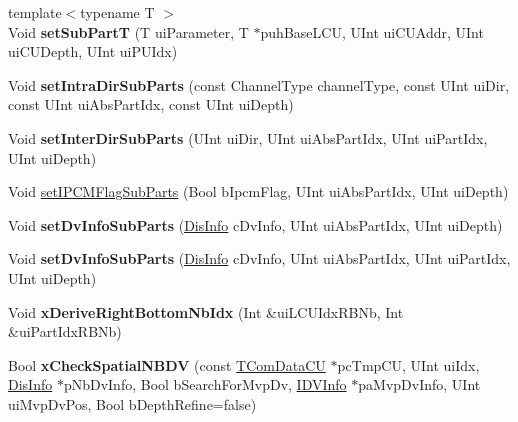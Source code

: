 \begin{DoxyCompactItemize}
\mbox{\label{class_t_com_data_c_u_a2d14701fc84c538dd53acc2389c1ea54}} 
{\footnotesize template$<$typename T $>$ }\\Void {\bfseries set\+Sub\+PartT} (T ui\+Parameter, T $\ast$puh\+Base\+L\+CU, U\+Int ui\+C\+U\+Addr, U\+Int ui\+C\+U\+Depth, U\+Int ui\+P\+U\+Idx)
\item 
\mbox{\label{class_t_com_data_c_u_a11c0dc78fd8f9ff8ff356a08fdd11f7f}} 
Void {\bfseries set\+Intra\+Dir\+Sub\+Parts} (const Channel\+Type channel\+Type, const U\+Int ui\+Dir, const U\+Int ui\+Abs\+Part\+Idx, const U\+Int ui\+Depth)
\item 
\mbox{\label{class_t_com_data_c_u_a007ff931bfc41d43f54d6757f7ac9357}} 
Void {\bfseries set\+Inter\+Dir\+Sub\+Parts} (U\+Int ui\+Dir, U\+Int ui\+Abs\+Part\+Idx, U\+Int ui\+Part\+Idx, U\+Int ui\+Depth)
\item 
Void \hyperlink{class_t_com_data_c_u_ac95621177b8187510ff1cf71ed5a11a0}{set\+I\+P\+C\+M\+Flag\+Sub\+Parts} (Bool b\+Ipcm\+Flag, U\+Int ui\+Abs\+Part\+Idx, U\+Int ui\+Depth)
\item 
\mbox{\label{class_t_com_data_c_u_af33ae1ee3e9120a73a1f4bbc5b207ca3}} 
Void {\bfseries set\+Dv\+Info\+Sub\+Parts} (\hyperlink{struct___dis_cand}{Dis\+Info} c\+Dv\+Info, U\+Int ui\+Abs\+Part\+Idx, U\+Int ui\+Depth)
\item 
\mbox{\label{class_t_com_data_c_u_a2ebf1d1715864545ce04942ef48bc4d7}} 
Void {\bfseries set\+Dv\+Info\+Sub\+Parts} (\hyperlink{struct___dis_cand}{Dis\+Info} c\+Dv\+Info, U\+Int ui\+Abs\+Part\+Idx, U\+Int ui\+Part\+Idx, U\+Int ui\+Depth)
\item 
\mbox{\label{class_t_com_data_c_u_a824eae0cc57f9d6f1d8a448f54595633}} 
Void {\bfseries x\+Derive\+Right\+Bottom\+Nb\+Idx} (Int \&ui\+L\+C\+U\+Idx\+R\+B\+Nb, Int \&ui\+Part\+Idx\+R\+B\+Nb)
\item 
\mbox{\label{class_t_com_data_c_u_a33417fc5d42925a90ae2b3ac4e8aeae7}} 
Bool {\bfseries x\+Check\+Spatial\+N\+B\+DV} (const \hyperlink{class_t_com_data_c_u}{T\+Com\+Data\+CU} $\ast$pc\+Tmp\+CU, U\+Int ui\+Idx, \hyperlink{struct___dis_cand}{Dis\+Info} $\ast$p\+Nb\+Dv\+Info, Bool b\+Search\+For\+Mvp\+Dv, \hyperlink{struct___i_d_v_cand}{I\+D\+V\+Info} $\ast$pa\+Mvp\+Dv\+Info, U\+Int ui\+Mvp\+Dv\+Pos, Bool b\+Depth\+Refine=false)

\end{DoxyCompactItemize}
